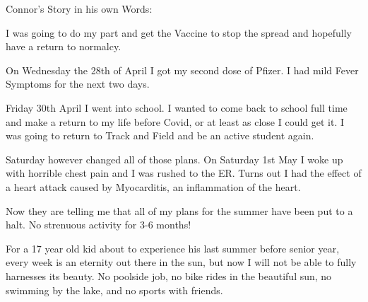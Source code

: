 Connor’s Story in his own Words:

I was going to do my part and get the Vaccine to stop the spread and hopefully
have a return to normalcy.

On Wednesday the 28th of April I got my second dose of Pfizer. I had mild Fever
Symptoms for the next two days.

Friday 30th April I went into school. I wanted to come back to school full time
and make a return to my life before Covid, or at least as close I could get
it. I was going to return to Track and Field and be an active student again.

Saturday however changed all of those plans. On Saturday 1st May I woke up with
horrible chest pain and I was rushed to the ER. Turns out I had the effect of a
heart attack caused by Myocarditis, an inflammation of the heart.

Now they are telling me that all of my plans for the summer have been put to a
halt. No strenuous activity for 3-6 months!

For a 17 year old kid about to experience his last summer before senior year,
every week is an eternity out there in the sun, but now I will not be able to
fully harnesses its beauty. No poolside job, no bike rides in the beautiful sun,
no swimming by the lake, and no sports with friends.

